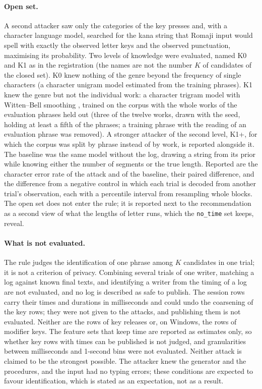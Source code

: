 \paragraph{Open set.} A second attacker saw only the categories of the key presses and, with a character language
model, searched for the kana string that Romaji input would spell with exactly the observed letter keys and the
observed punctuation, maximising its probability. Two levels of knowledge were evaluated, named K0 and K1 as in the
registration (the names are not the number $K$ of candidates of the closed set). K0 knew nothing of the genre beyond
the frequency of single characters (a character unigram model estimated from the training phrases). K1 knew the
genre but not the individual work: a character trigram model with Witten--Bell smoothing
\citep{wittenbell1991}, trained on the corpus with the whole works of the evaluation phrases held out (three of the
twelve works, drawn with the seed, holding at least a fifth of the phrases; a training phrase with the reading of an
evaluation phrase was removed). A stronger attacker of the second level, K1+, for which the corpus was split by phrase
instead of by work, is reported alongside it. The baseline was the same model without the log, drawing a string from
its prior while knowing either the number of segments or the true length. Reported are the character error rate of
the attack and of the baseline, their paired difference, and the difference from a negative control in which each
trial is decoded from another trial's observation, each with a percentile interval from resampling whole blocks. The
open set does not enter the rule; it is reported next to the recommendation as a second view of what the lengths of
letter runs, which the \texttt{no\_time} set keeps, reveal.

\paragraph{What is not evaluated.} The rule judges the identification of one phrase among $K$ candidates in one
trial; it is not a criterion of privacy. Combining several trials of one writer, matching a log against known final
texts, and identifying a writer from the timing of a log are not evaluated, and no log is described as safe to
publish. The session rows carry their
times and durations in milliseconds and could undo the coarsening of the key rows; they were not given to the attacks,
and publishing them is not evaluated. Neither are the rows of key releases or, on Windows, the rows of modifier keys.
The feature sets that keep time are reported as estimates only, so whether key rows with times can be published is
not judged, and granularities between milliseconds and 1-second bins were not evaluated. Neither attack is
claimed to be the strongest possible. The attacker knew the generator and the procedures, and the input had no
typing errors; these conditions are expected to favour identification, which is stated as an expectation, not as a
result.

